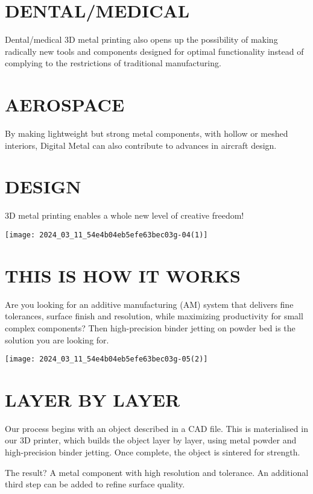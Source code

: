 \documentclass[10pt]{article}
\begin{document}
\section*{DENTAL/MEDICAL}
Dental/medical 3D metal printing also opens up the possibility of making radically new tools and components designed for optimal functionality instead of complying to the restrictions of traditional manufacturing.

\section*{AEROSPACE}
By making lightweight but strong metal components, with hollow or meshed interiors, Digital Metal can also contribute to advances in aircraft design.

\section*{DESIGN}
3D metal printing enables a whole new level of creative freedom!

\begin{center}
\texttt{[image: 2024\_03\_11\_54e4b04eb5efe63bec03g-04(1)]}
\end{center}

\section*{THIS IS HOW IT WORKS}
Are you looking for an additive manufacturing (AM) system that delivers fine tolerances, surface finish and resolution, while maximizing productivity for small complex components? Then high-precision binder jetting on powder bed is the solution you are looking for.

\begin{center}
\texttt{[image: 2024\_03\_11\_54e4b04eb5efe63bec03g-05(2)]}
\end{center}

\section*{LAYER BY LAYER}
Our process begins with an object described in a CAD file. This is materialised in our $3 \mathrm{D}$ printer, which builds the object layer by layer, using metal powder and high-precision binder jetting. Once complete, the object is sintered for strength.

The result? A metal component with high resolution and tolerance. An additional third step can be added to refine surface quality.
\end{document}
